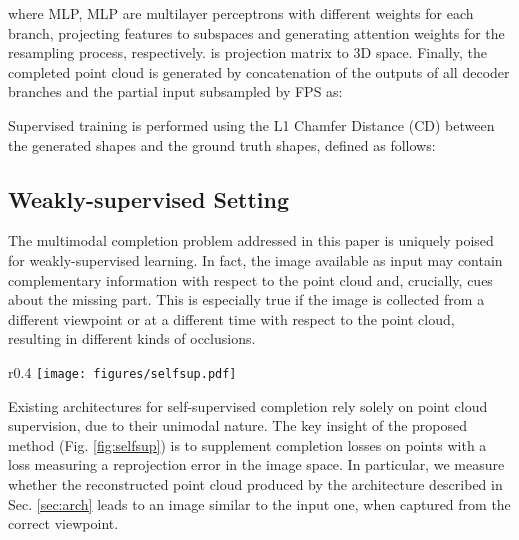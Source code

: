 \documentclass{article}
\begin{document}
where MLP, MLP are multilayer perceptrons with different weights for each branch, projecting features to  subspaces and generating attention weights for the resampling process, respectively.  is projection matrix to 3D space.
Finally, the completed point cloud is generated by concatenation of the outputs of all decoder branches and the partial input subsampled by FPS as:



Supervised training is performed using the L1 Chamfer Distance (CD) between the generated shapes and the ground truth shapes, defined as follows:




\subsection{Weakly-supervised Setting}

The multimodal completion problem addressed in this paper is uniquely poised for weakly-supervised learning. In fact, the image available as input may contain complementary information with respect to the point cloud and, crucially, cues about the missing part. This is especially true if the image is collected from a different viewpoint or at a different time with respect to the point cloud, resulting in different kinds of occlusions. 
\begin{wrapfigure}[12]{r}{0.4\textwidth}
\centering
 \texttt{[image: figures/selfsup.pdf]}
    \caption{Weakly-supervised training.}
  \label{fig:selfsup}
\end{wrapfigure}

Existing architectures for self-supervised completion \cite{crn} \cite{selfsup}  rely solely on point cloud supervision, due to their unimodal nature. The key insight of the proposed method (Fig. \ref{fig:selfsup}) is to supplement completion losses on points with a loss measuring a reprojection error in the image space. In particular, we measure whether the reconstructed point cloud produced by the architecture described in Sec. \ref{sec:arch} leads to an image similar to the input one, when captured from the correct viewpoint.
 
\end{document}
